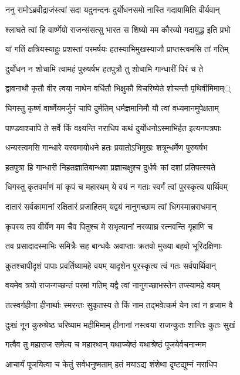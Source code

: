 \twolineshloka
{ननु रामोऽब्रवीद्राजंस्त्वां सदा यदुनन्दनः}
{दुर्योधनसमो नास्ति गदायामिति वीर्यवान्}


\twolineshloka
{श्लाघते त्वां हि वार्ष्णेयो राजन्संसत्सु भारत}
{स शिष्यो मम कौरव्यो गदायुद्ध इति प्रभो}


\twolineshloka
{यां गतिं क्षत्रियस्याहुः प्रशस्तां परमर्षयः}
{हतस्याभिमुखस्याजौ प्राप्तस्त्वमसि तां गतिम्}


\twolineshloka
{दुर्योधन न शोचामि त्वामहं पुरुषर्षभ}
{हतपुत्रौ तु शोचामि गान्धारीं पिरं च ते}


\twolineshloka
{द्वावनाथौ कृतौ वीर त्वया नाथेन वर्धितौ}
{भिक्षुकौ विचरिष्येते शोचन्तौ पृथिवीमिमाम््}


\twolineshloka
{घिगस्तु कृष्णं वार्ष्णेयमर्जुनं चापि दुर्मतिम्}
{धर्मज्ञमानिमौ यौ त्वां वध्यमानमुपेक्षताम्}


\twolineshloka
{पाण्डवाश्चापि ते सर्वे किं वक्ष्यन्ति नराधिप}
{कथं दुर्योधनोऽस्माभिर्हत इत्यनपत्रपाः}


\twolineshloka
{धन्यस्त्वमसि गान्धारे यस्वमायोधने हतः}
{प्रयातोऽभिमुखः शत्रून्धर्मेण पुरुषर्षभ}


\twolineshloka
{हतपुत्रा हि गान्धारी निहतज्ञातिबान्धवा}
{प्रज्ञाचक्षुश्च दुर्धर्षः कां दशां प्रतिपत्स्यते}


\twolineshloka
{धिगस्तु कृतवर्माणं मां कृपं च महारथम्}
{ये वयं न गताः स्वर्गं त्वां पुरस्कृत्य पार्थिवम्}


\twolineshloka
{दातारं सर्वकामानां रक्षितारं प्रजाहितम्}
{यद्वयं नानुगच्छाम त्वां धिगस्मान्नराधमान्}


\twolineshloka
{कृपस्य तव वीर्येण मम चैव पितुश्च मे}
{सभृत्यानां नरव्याघ्र रत्नवन्ति गृहाणि च}


\twolineshloka
{तव प्रसादादस्माभिः समित्रैः सह बान्धवैः}
{अवाप्ताः क्रतवो मुख्या बहवो भूरिदक्षिणाः}


\twolineshloka
{कुतश्चापीदृशं पापाः प्रवर्तिष्यामहे वयम्}
{यादृशेन पुरस्कृत्य त्वं गतः सर्वपार्थिवान्}


\threelineshloka
{वयमेव त्रयो राजन्गच्छन्तं परमां गतिम्}
{यद्वै त्वां नानुगच्छाभस्तेन तप्स्यामहे वयम्}
{}


\twolineshloka
{तत्स्वर्गहीना हीनार्थाः स्मरन्तः सुकृतस्य ते}
{किं नाम तद्भवेत्कर्म येन त्वां न व्रजाम वै}


\twolineshloka
{दुःखं नून कुरुश्रेष्ठ चरिष्याम महीमिमाम्}
{हीनानां नस्त्वया राजन्कुतः शान्तिः कुतः सुखं}


\twolineshloka
{गत्वैव तु महाराज समेत्य च महारथान्}
{यथाज्येष्ठं यथाश्रेष्ठं पूजयेर्वचनान्मम}


\twolineshloka
{आचार्यं पूजयित्वा च केतुं सर्वधनुष्मताम्}
{हतं मयाऽद्य शंशेथा दृष्टद्युम्नं नराधिप}


